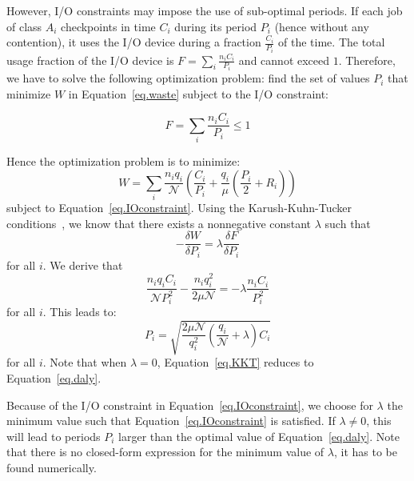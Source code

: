 \documentclass[two]{article}
\newcommand{\nbnodesplat}{{\mathcal N}}
\newcommand{\app}[1]{A_{#1}}
\newcommand{\nbapp}[1]{n_{#1}}
\newcommand{\nbnodes}[1]{q_{#1}}
\newcommand{\period}[1]{P_{#1}}
\newcommand{\ckpt}[1]{C_{#1}}
\newcommand{\reco}[1]{R_{#1}}
\newcommand{\mtbfplat}{\mu}
\newcommand{\wasteplat}{W}
\newcommand{\ioconstraint}{F}
\begin{document}
However, I/O constraints may impose the use of sub-optimal periods. If each job
of class $\app{i}$ checkpoints in time $\ckpt{i}$ during its period $\period{i}$ (hence
without any contention), it uses the I/O device during a fraction $\frac{\ckpt{i}}{\period{i}}$ of the time.
The total usage fraction of the  I/O device is $\ioconstraint = \sum_{i} \frac{\nbapp{i} \ckpt{i}}{\period{i}}$
and cannot exceed $1$. Therefore, we have to solve the following optimization problem: find
the set of values $\period{i}$ that minimize $\wasteplat$ in Equation~\eqref{eq.waste} subject to the I/O constraint:

\begin{equation}
\ioconstraint = \sum_{i} \frac{\nbapp{i} \ckpt{i}}{\period{i}} \leq 1
\label{eq.IOconstraint}
\end{equation}

Hence the optimization problem is to minimize:
\begin{equation}
\wasteplat = \sum_i \frac{\nbapp{i} \nbnodes{i}}{\nbnodesplat}  \left( \frac{\ckpt{i}}{\period{i}} +
\frac{\nbnodes{i}}{\mtbfplat}(\frac{\period{i}}{2} + \reco{i}) \right)
\label{eq.totalwaste}
\end{equation}
subject to Equation~\eqref{eq.IOconstraint}.
Using the Karush-Kuhn-Tucker conditions~\cite{Boyd2004}, we know that there exists a nonnegative constant
$\lambda$
such that
$$- \frac{\delta \wasteplat}{\delta \period{i}} = \lambda \frac{\delta \ioconstraint}{\delta \period{i}}$$
for all $i$. We derive that
$$\frac{\nbapp{i} \nbnodes{i} \ckpt{i}}{\nbnodesplat \period{i}^{2}} -    \frac{\nbapp{i} \nbnodes{i}^{2}}{2 \mtbfplat \nbnodesplat} = - \lambda \frac{\nbapp{i} \ckpt{i}}{\period{i}^{2}}
$$
for all $i$. This leads to:
 \begin{equation}
\period{i} = \sqrt{\frac{2 \mtbfplat  \nbnodesplat}{\nbnodes{i}^{2}} \left(\frac{\nbnodes{i}}{\nbnodesplat} +\lambda \right) \ckpt{i}}
  \label{eq.KKT}
\end{equation}
for all $i$. Note that when $\lambda=0$, Equation~\eqref{eq.KKT} reduces to Equation~\eqref{eq.daly}.

Because of the I/O constraint in Equation~\eqref{eq.IOconstraint}, we choose
for $\lambda$ the minimum value such that Equation~\eqref{eq.IOconstraint} is
satisfied. If $\lambda \neq 0$, this will lead to periods $P_{i}$ larger than
the optimal value of Equation~\eqref{eq.daly}. Note that there is no
closed-form expression for the minimum value of $\lambda$, it has to be found
numerically.
\end{document}
